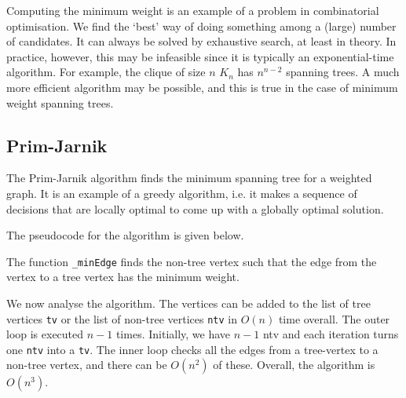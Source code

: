 \documentclass[a4paper, openany]{memoir}
\begin{document}
Computing the minimum weight is an example of a problem in combinatorial optimisation. We find the `best' way of doing something among a (large) number of candidates. It can always be solved by exhaustive search, at least in theory. In practice, however, this may be infeasible since it is typically an exponential-time algorithm. For example, the clique of size $n$ $K_n$ has $n^{n-2}$ spanning trees. A much more efficient algorithm may be possible, and this is true in the case of minimum weight spanning trees.

\subsection{Prim-Jarnik}
The Prim-Jarnik algorithm finds the minimum spanning tree for a weighted graph. It is an example of a greedy algorithm, i.e. it makes a sequence of decisions that are locally optimal to come up with a globally optimal solution.

The pseudocode for the algorithm is given below.

The function \texttt{\_minEdge} finds the non-tree vertex such that the edge from the vertex to a tree vertex has the minimum weight.

We now analyse the algorithm. The vertices can be added to the list of tree vertices \texttt{tv} or the list of non-tree vertices \texttt{ntv} in $O(n)$ time overall. The outer loop is executed $n-1$ times. Initially, we have $n-1$ ntv and each iteration turns one \texttt{ntv} into a \texttt{tv}. The inner loop checks all the edges from a tree-vertex to a non-tree vertex, and there can be $O(n^2)$ of these. Overall, the algorithm is $O(n^3)$.
\end{document}
